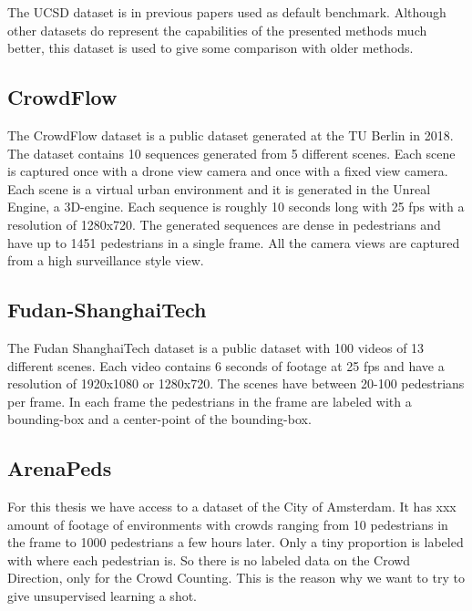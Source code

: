 The UCSD dataset is in previous papers used as default benchmark. Although other datasets do represent the capabilities of the presented methods much better, this dataset is used to give some comparison with older methods.

\subsection{CrowdFlow}
The CrowdFlow dataset \cite{Schroder2019} is a public dataset generated at the TU Berlin in 2018. The dataset contains 10 sequences generated from 5 different scenes. Each scene is captured once with a drone view camera and once with a fixed view camera. Each scene is a virtual urban environment and it is generated in the Unreal Engine, a 3D-engine. Each sequence is roughly 10 seconds long with 25 fps with a resolution of 1280x720. The generated sequences are dense in pedestrians and have up to 1451 pedestrians in a single frame. All the camera views are captured from a high surveillance style view.

\subsection{Fudan-ShanghaiTech}
The Fudan ShanghaiTech dataset \cite{Fang2019} is a public dataset with 100 videos of 13 different scenes. Each video contains 6 seconds of footage at 25 fps and have a resolution of 1920x1080 or 1280x720. The scenes have between 20-100 pedestrians per frame. In each frame the pedestrians in the frame are labeled with a bounding-box and a center-point of the bounding-box.

\subsection{ArenaPeds}
For this thesis we have access to a dataset of the City of Amsterdam. It has xxx amount of footage of environments with crowds ranging from 10 pedestrians in the frame to 1000 pedestrians a few hours later. Only a tiny proportion is labeled with where each pedestrian is. So there is no labeled data on the Crowd Direction, only for the Crowd Counting. This is the reason why we want to try to give unsupervised learning a shot.

